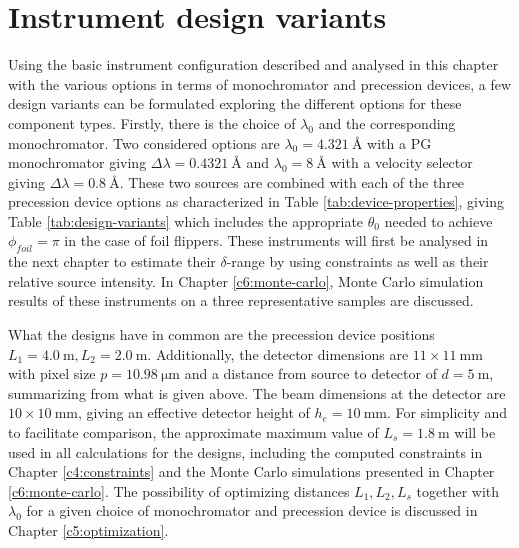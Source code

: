 \section{Instrument design variants}
\label{c3.7}
Using the basic instrument configuration described and analysed in this chapter with the various options in terms of monochromator and precession devices, a few design variants can be formulated exploring the different options for these component types. Firstly, there is the choice of $\lambda_0$ and the corresponding monochromator. Two considered options are $\lambda_0 = \SI{4.321}{\angstrom}$ with a PG monochromator giving $\Delta\lambda = \SI{0.4321}{\angstrom}$ and $\lambda_0 = \SI{8}{\angstrom}$ with a velocity selector giving $\Delta\lambda = \SI{0.8}{\angstrom}$. These two sources are combined with each of the three precession device options as characterized in Table \ref{tab:device-properties}, giving Table \ref{tab:design-variants} which includes the appropriate $\theta_0$ needed to achieve $\phi_{foil} = \pi$ in the case of foil flippers. These instruments will first be analysed in the next chapter to estimate their $\delta$-range by using constraints as well as their relative source intensity. In Chapter \ref{c6:monte-carlo}, Monte Carlo simulation results of these instruments on a three representative samples are discussed. 

What the designs have in common are the precession device positions $L_1 = \SI{4.0}{\meter}, L_2 = \SI{2.0}{\meter}$. Additionally, the detector dimensions are $11\times 11~\unit{\milli\meter}$ with pixel size $p = \SI{10.98}{\micro\meter}$ and a distance from source to detector of $d = \SI{5}{\meter}$, summarizing from what is given above. The beam dimensions at the detector are $10\times 10~\unit{\milli\meter}$, giving an effective detector height of $h_e =\SI{10}{\milli\meter}$. For simplicity and to facilitate comparison, the approximate maximum value of $L_s = \SI{1.8}{\meter}$ will be used in all calculations for the designs, including the computed constraints in Chapter \ref{c4:constraints} and the Monte Carlo simulations presented in Chapter \ref{c6:monte-carlo}. The possibility of optimizing distances $L_1, L_2, L_s$ together with $\lambda_0$ for a given choice of monochromator and precession device is discussed in Chapter \ref{c5:optimization}.  




